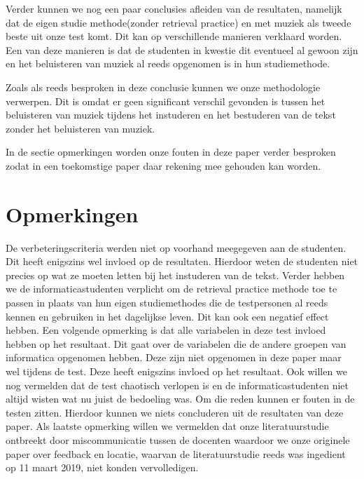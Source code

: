 \documentclass{hogent-article}
\begin{document}
	Verder kunnen we nog een paar conclusies afleiden van de resultaten, namelijk dat de eigen studie methode(zonder retrieval practice) en met muziek als tweede beste uit onze test komt. Dit kan op verschillende manieren verklaard worden. Een van deze manieren is dat de studenten in kwestie dit eventueel al gewoon zijn en het beluisteren van muziek al reeds opgenomen is in hun studiemethode. 
	
	Zoals als reeds besproken in deze conclusie kunnen we onze methodologie verwerpen. Dit is omdat er geen significant verschil gevonden is tussen het beluisteren van muziek tijdens het instuderen en het bestuderen van de tekst zonder het beluisteren van muziek. 
    
    In de sectie opmerkingen worden onze fouten in deze paper verder besproken zodat in een toekomstige paper daar rekening mee gehouden kan worden.
	
	
	\section{Opmerkingen}
	De verbeteringscriteria werden niet op voorhand meegegeven aan de studenten. Dit heeft enigszins wel invloed op de resultaten. Hierdoor weten de studenten niet precies op wat ze moeten letten bij het instuderen van de tekst.
	Verder hebben we de informaticastudenten verplicht om de retrieval practice methode toe te passen in plaats van hun eigen studiemethodes die de testpersonen al reeds kennen en gebruiken in het dagelijkse leven. Dit kan ook een negatief effect hebben.
	Een volgende opmerking is dat alle variabelen in deze test invloed hebben op het resultaat. Dit gaat over de variabelen die de andere groepen van informatica opgenomen hebben. Deze zijn niet opgenomen in deze paper maar wel tijdens de test. Deze heeft enigszins invloed op het resultaat.
	Ook willen we nog vermelden dat de test chaotisch verlopen is en de informaticastudenten niet altijd wisten wat nu juist de bedoeling was. Om die reden kunnen er fouten in de testen zitten. 
	Hierdoor kunnen we niets concluderen uit de resultaten van deze paper.
    Als laatste opmerking willen we vermelden dat onze literatuurstudie ontbreekt door miscommunicatie tussen de docenten waardoor we onze originele paper over feedback en locatie, waarvan de literatuurstudie reeds was ingedient op 11 maart 2019, niet konden vervolledigen.
	
	
	\printbibliography[heading=bibintoc]
	
\end{document}

